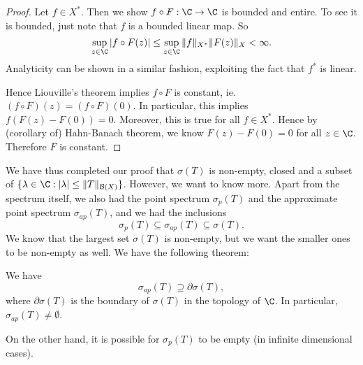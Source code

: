 \documentclass[a4paper]{article}
\begin{document}
\begin{proof}
  Let $f \in X^*$. Then we show $f \circ F: \C \to \C$ is bounded and entire. To see it is bounded, just note that $f$ is a bounded linear map. So
  \[
    \sup_{z \in \C} |f\circ F(z)| \leq \sup_{ z \in \C} \|f\|_{X^*} \|F(z)\|_X < \infty.
  \]
  Analyticity can be shown in a similar fashion, exploiting the fact that $f^*$ is linear.

  Hence Liouville's theorem implies $f \circ F$ is constant, ie. $(f \circ F)(z) = (f\circ F)(0)$. In particular, this implies $f(F(z) - F(0)) = 0$. Moreover, this is true for all $f \in X^*$. Hence by (corollary of) Hahn-Banach theorem, we know $F(z) - F(0) = 0$ for all $z \in \C$. Therefore $F$ is constant.
\end{proof}
We have thus completed our proof that $\sigma(T)$ is non-empty, closed and a subset of $\{\lambda \in \C: |\lambda| \leq \|T\|_{\mathcal{B}(X)}\}$. However, we want to know more. Apart from the spectrum itself, we also had the point spectrum $\sigma_p(T)$ and the approximate point spectrum $\sigma_{ap}(T)$, and we had the inclusions
\[
  \sigma_p(T) \subseteq \sigma_{ap}(T) \subseteq \sigma(T).
\]
We know that the largest set $\sigma(T)$ is non-empty, but we want the smaller ones to be non-empty as well. We have the following theorem:
\begin{thm}
  We have
  \[
    \sigma_{ap}(T) \supseteq \partial \sigma(T),
  \]
  where $\partial \sigma(T)$ is the boundary of $\sigma(T)$ in the topology of $\C$. In particular, $\sigma_{ap}(T) \not= \emptyset$.
\end{thm}
On the other hand, it is possible for $\sigma_p(T)$ to be empty (in infinite dimensional cases).
\end{document}
